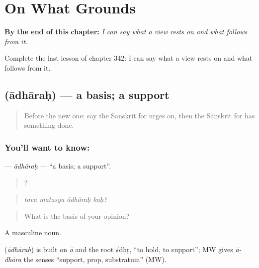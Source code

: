 
\chapter{On What Grounds}
\label{ch:sa-on-what-grounds}

\begin{chapteropening}
\textbf{By the end of this chapter:} \emph{I can say what a view rests on and what follows from it.}

Complete the last lesson of chapter 342: I can say what a view rests on and what follows from it.
\end{chapteropening}

\section[\texorpdfstring{\sk{आधारः} (ādhāraḥ)}{आधारः (ādhāraḥ)}]{ (ādhāraḥ) — a basis; a support}

\label{lesson:SA-C342-adharah}



\begin{quote}
Before the new one: say the Sanskrit for urges on, then the Sanskrit for has something done.
\end{quote}

\subsection*{You'll want to know: }
\textbf{} — \emph{ādhāraḥ} — \textquotedblleft{}a basis; a support\textquotedblright{}.

\begin{quote}
   ?
\end{quote}

\begin{quote}
\emph{tava matasya ādhāraḥ kaḥ?}
\end{quote}

\begin{quote}
What is the basis of your opinion?
\end{quote}

A masculine noun.

\begin{cousinweb}
\textbf{} (\emph{ādhāraḥ}) is built on \emph{ā} and the root √dhṛ, \textquotedblleft{}to hold, to support\textquotedblright{}; MW gives \emph{ā-dhāra} the senses \textquotedblleft{}support, prop, substratum\textquotedblright{} (MW).
\end{cousinweb}

